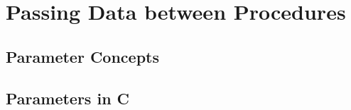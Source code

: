 \chapter{Passing Data between Procedures} %
\label{cha:passing_data_between_procedures}

\minitoc


\section{Parameter Concepts} %
\label{sec:parameter_concepts}






\clearpage
\section{Parameters in C} %
\label{sec:parameters_in_c}






